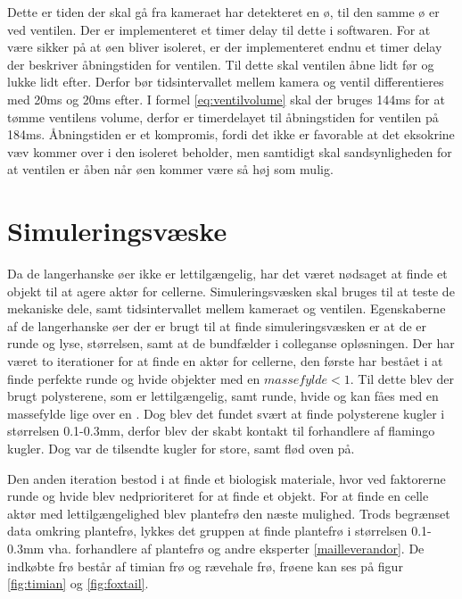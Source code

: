 Dette er tiden der skal gå fra kameraet har detekteret en ø, til den samme ø er ved ventilen. Der er implementeret et timer delay til dette i softwaren. For at være sikker på at øen bliver isoleret, er der implementeret endnu et timer delay der beskriver åbningstiden for ventilen. Til dette skal ventilen åbne lidt før og lukke lidt efter. Derfor bør tidsintervallet mellem kamera og ventil differentieres med 20ms og 20ms efter. I formel \ref{eq:ventilvolume} skal der bruges 144ms for at tømme ventilens volume, derfor er timerdelayet til åbningstiden for ventilen på 184ms. 
Åbningstiden er et kompromis, fordi det ikke er favorable at det eksokrine væv kommer over i den isoleret beholder, men samtidigt skal sandsynligheden for at ventilen er åben når øen kommer være så høj som mulig.



\section{Simuleringsvæske}
\label{sec:simuleringsv}
Da de langerhanske øer ikke er lettilgængelig, har det været nødsaget at finde et objekt til at agere aktør for cellerne. Simuleringsvæsken skal bruges til at teste de mekaniske dele, samt tidsintervallet mellem kameraet og ventilen. Egenskaberne af de langerhanske øer der er brugt til at finde simuleringsvæsken er at de er runde og lyse, størrelsen, samt at de bundfælder i colleganse opløsningen. Der har været to iterationer for at finde en aktør for cellerne, den første har bestået i at finde perfekte runde og hvide objekter med en $massefylde<1$. Til dette blev der brugt polysterene, som er lettilgængelig, samt runde, hvide og kan fåes med en massefylde lige over en \citep{polybog}. Dog blev det fundet svært at finde polysterene kugler i størrelsen 0.1-0.3mm, derfor blev der skabt kontakt til forhandlere af flamingo kugler. Dog var de tilsendte kugler for store, samt flød oven på. 

Den anden iteration bestod i at finde et biologisk materiale, hvor ved faktorerne runde og hvide blev nedprioriteret for at finde et objekt. For at finde en celle aktør med lettilgængelighed blev plantefrø den næste mulighed. Trods begrænset data omkring plantefrø, lykkes det gruppen at finde plantefrø i størrelsen 0.1-0.3mm vha. forhandlere af plantefrø og andre eksperter \ref{mailleverandor}. De indkøbte frø består af timian frø og rævehale frø, frøene kan ses på figur \ref{fig:timian} og \ref{fig:foxtail}.

